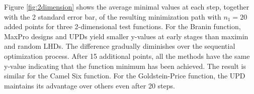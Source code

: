 \documentclass [PhD] {package/uclathes}
\begin{document}
Figure \ref{fig:2dimension} shows the average minimal values at each step, together with the 2 standard error bar, of the resulting minimization path with $n_1=20$ added points for three 2-dimensional test functions.
For the Branin function,  MaxPro designs and UPDs yield smaller y-values at early stages than maximin and random LHDs. The difference gradually diminishes over the sequential optimization process. After 15 additional points, all the methods have the same y-value indicating that the function minimum has been achieved. The result is similar for the Camel Six function. For the Goldstein-Price function, the UPD maintains its advantage over others even after 20 steps.







\end{document}
